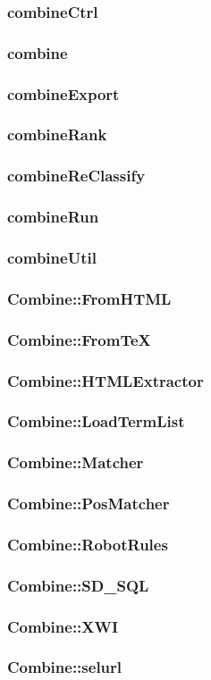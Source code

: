 \subsubsection{combineCtrl}

\subsubsection{combine}

\subsubsection{combineExport}

\subsubsection{combineRank}

\subsubsection{combineReClassify}

\subsubsection{combineRun}

\subsubsection{combineUtil}

\subsubsection{Combine::FromHTML}

\subsubsection{Combine::FromTeX}

\subsubsection{Combine::HTMLExtractor}

\subsubsection{Combine::LoadTermList}

\subsubsection{Combine::Matcher}

\subsubsection{Combine::PosMatcher}

\subsubsection{Combine::RobotRules}

\subsubsection{Combine::SD\_SQL}

\subsubsection{Combine::XWI}

\subsubsection{Combine::selurl}

